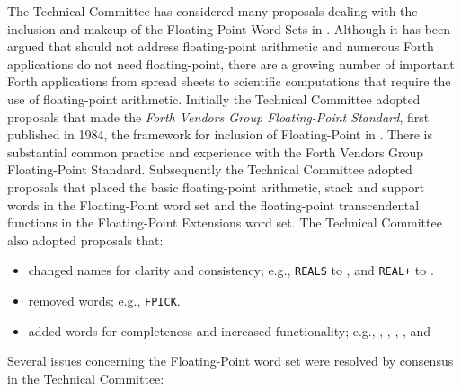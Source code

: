 The Technical Committee has considered many proposals dealing with
the inclusion and makeup of the Floating-Point Word Sets in .
Although it has been argued that  should not address
floating-point arithmetic and numerous Forth applications do not need
floating-point, there are a growing number of important Forth
applications from spread sheets to scientific computations that
require the use of floating-point arithmetic. Initially the Technical
Committee adopted proposals that made the \emph{Forth Vendors Group
Floating-Point Standard}, first published in 1984, the framework for
inclusion of Floating-Point in . There is substantial common
practice and experience with the Forth Vendors Group Floating-Point
Standard.  Subsequently the Technical Committee adopted proposals that
placed the basic floating-point arithmetic, stack and support words
in the Floating-Point word set and the floating-point transcendental
functions in the Floating-Point Extensions word set. The Technical
Committee also adopted proposals that:

\begin{itemize}
\item changed names for clarity and consistency; e.g.,
	\texttt{REALS} to , and
	\texttt{REAL+} to .
\item removed words; e.g., \texttt{FPICK}.
\item added words for completeness and increased functionality; e.g.,
	,
	,
	,
	,
	 and
\end{itemize}

Several issues concerning the Floating-Point word set were resolved
by consensus in the Technical Committee:

